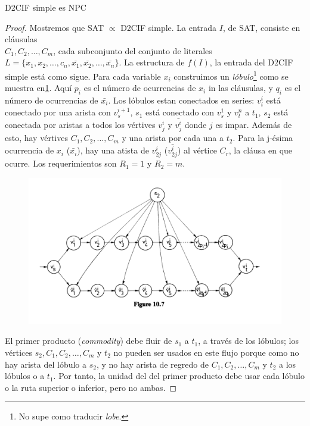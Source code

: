 \documentclass[12pt,letterpaper]{article}
\begin{document}
\begin{theorem}
D2CIF simple es NPC
\begin{proof}
    Mostremos que SAT $\propto$ D2CIF simple. La entrada $I$, de SAT, consiste en cláusulas\\
    $C_1, C_2, \ldots , C_m$, cada subconjunto del conjunto de literales
    $L = \{ x_1,x_2,\ldots, c_n, \bar{x_1}, \bar{x_2},\ldots,\bar{x_n} \}$. La estructura de
    $f(I)$, la entrada del D2CIF simple está como sigue. Para cada variable $x_i$ construimos
    un \textit{lóbulo}\footnote{No supe como traducir \textit{lobe}.} como se muestra
    en\ref{fig:10_7}. Aquí $p_i$ es el número de ocurrencias de $x_i$ in las cláusulas, y $q_i$
    es el número de ocurrencias de $\bar{x_i}$. Los lóbulos estan conectados en series:
    $v_i^i$ está conectado por una arista con $v_s^{i+1}$, $s_1$ está conectado con $v_s^1$ y
    $v_t^n$ a $t_1$, $s_2$ está conectada por aristas a todos los vértives $v_j^i$ y 
    $\bar{v_j^i}$ donde $j$ es impar. Además de esto, hay vértives $C_1, C_2, \ldots, C_m$ y
    una arista por cada una a $t_2$. Para la j-ésima ocurrencia de $x_i$ ($\bar{x_i}$), hay una
    atista de $v_{2j}^i$ ($\bar{v_{2j}^i}$) al vértice $C_r$, la cláusa en que ocurre.
    Los requerimientos son $R_1 = 1$ y $R_2 = m$.
    
    \begin{figure}
        \includegraphics[scale=0.5]{assets/1.png}
        \label{fig:10_7}
    \end{figure}

    El primer producto (\textit{commodity}) debe fluir de $s_1$ a $t_1$, a través de los lóbulos;
    los vértices $s_2, C_1, C_2, \ldots, C_m$ y $t_2$ no pueden ser usados en este flujo porque
    como no hay arista del lóbulo a $s_2$, y no hay arista de regredo de $C_1, C_2, \ldots, C_m$
    y $t_2$ a los lóbulos o a $t_1$. Por tanto, la unidad del del primer producto debe usar cada 
    lóbulo o la ruta superior o inferior, pero no ambas.


\end{proof}
\end{theorem}
\end{document}
